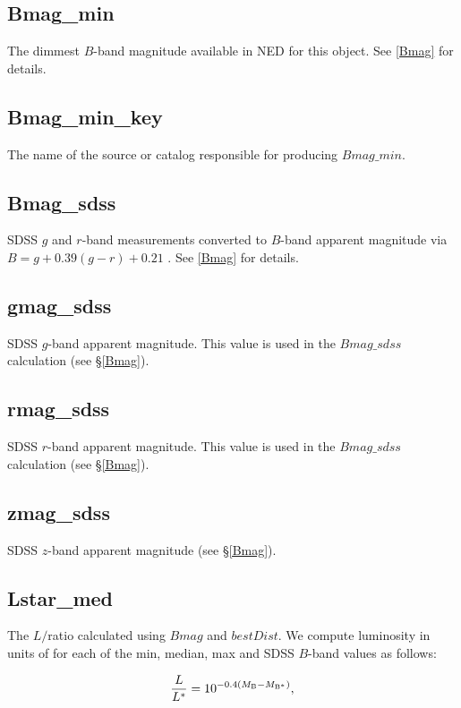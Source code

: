 \subsection{Bmag\_min}
The dimmest $B$-band magnitude available in NED for this object. See \ref{Bmag} for details.

\subsection{Bmag\_min\_key}
The name of the source or catalog responsible for producing $Bmag\_min$.

\subsection{Bmag\_sdss} \label{Bmag_sdss}
SDSS $g$ and $r$-band measurements converted to $B$-band apparent magnitude via $B = g + 0.39 (g-r) + 0.21$ \citep{jester2005}. See \ref{Bmag} for details.

\subsection{gmag\_sdss}
SDSS $g$-band apparent magnitude. This value is used in the $Bmag\_sdss$ calculation (see \S \ref{Bmag}).

\subsection{rmag\_sdss}
SDSS $r$-band apparent magnitude. This value is used in the $Bmag\_sdss$ calculation (see \S \ref{Bmag}).

\subsection{zmag\_sdss}
SDSS $z$-band apparent magnitude (see \S \ref{Bmag}).

\subsection{Lstar\_med} \label{Lstar_med}
The $L / $\Lstar ratio calculated using $Bmag$ and $bestDist$. We compute luminosity in units of \Lstar for each of the min, median, max and SDSS $B$-band values as follows:

\begin{equation}
	\frac{L}{L^*} = 10^{-0.4 (M_{\rm B} - M_{\rm B^{*}})},
	\label{lstar}
\end{equation}

